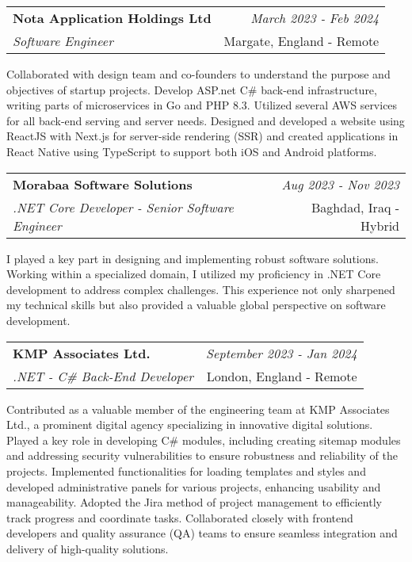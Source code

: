 \documentclass[a4paper,10pt]{article}
\makeatletter
\newcommand{\resumeSubheading}[4]{
	\vspace{0.5mm}\item
	\begin{tabular*}{0.98\textwidth}[t]{l@{\extracolsep{\fill}}r}
		\textbf{#1} & \textit{\footnotesize{#4}} \\
		\textit{\footnotesize{#3}} &  \footnotesize{#2}\\
	\end{tabular*}
	\vspace{-2.4mm}
}
\newcommand{\resumeItemListStart}{\begin{justify}\begin{itemize}[leftmargin=3ex, rightmargin=2ex, noitemsep,labelsep=1.2mm,itemsep=0mm]\small}
\newcommand{\resumeItemListEnd}{\end{itemize}\end{justify}\vspace{-2mm}}
\makeatother
\begin{document}
\vspace{-1mm}
\resumeSubheading
{Nota Application Holdings Ltd}{Margate, England - Remote}
{Software Engineer}{March 2023 - Feb 2024}
\resumeItemListStart
Collaborated with design team and co-founders to understand the purpose and objectives of startup projects. Develop ASP.net C\# back-end infrastructure, writing parts of microservices in Go and PHP 8.3. Utilized several AWS services for all back-end serving and server needs. Designed and developed a website using ReactJS with Next.js for server-side rendering (SSR) and created applications in React Native using TypeScript to support both iOS and Android platforms.
\resumeItemListEnd

\vspace{-1mm}
\resumeSubheading
{Morabaa Software Solutions}{Baghdad, Iraq - Hybrid}
{.NET Core Developer - Senior Software Engineer}{Aug 2023 - Nov 2023}
\resumeItemListStart
I played a key part in designing and implementing robust software solutions. Working within a specialized domain, I utilized my proficiency in .NET Core development to address complex challenges. This experience not only sharpened my technical skills but also provided a valuable global perspective on software development.
\resumeItemListEnd

\vspace{-1mm}
\resumeSubheading
{KMP Associates Ltd.}{London, England - Remote}
{.NET - C\# Back-End Developer}{September 2023 - Jan 2024}
\resumeItemListStart
Contributed as a valuable member of the engineering team at KMP Associates Ltd., a prominent digital agency specializing in innovative digital solutions. Played a key role in developing C\# modules, including creating sitemap modules and addressing security vulnerabilities to ensure robustness and reliability of the projects. Implemented functionalities for loading templates and styles and developed administrative panels for various projects, enhancing usability and manageability. Adopted the Jira method of project management to efficiently track progress and coordinate tasks. Collaborated closely with frontend developers and quality assurance (QA) teams to ensure seamless integration and delivery of high-quality solutions.
\resumeItemListEnd
\end{document}
